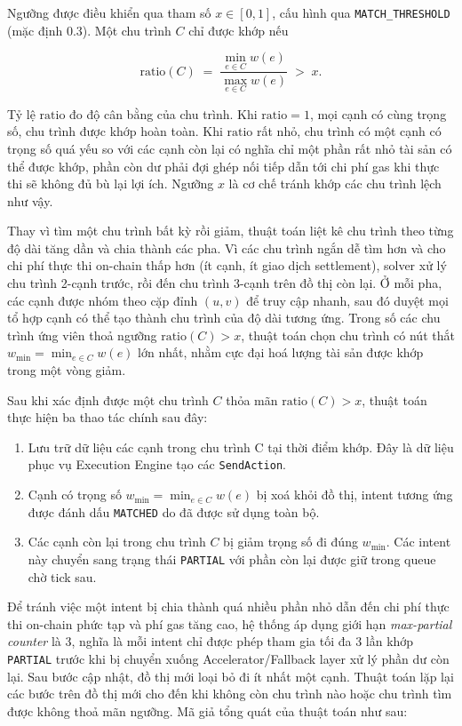 Ngưỡng được điều khiển qua tham số $x \in [0, 1]$, cấu hình 
qua \texttt{MATCH\_THRESHOLD} (mặc định $0.3$). 
Một chu trình $C$ chỉ được khớp nếu

\[
  \mathrm{ratio}(C) \;=\; \frac{\min_{e \in C} w(e)}{\max_{e \in C} w(e)} \;>\; x.
\]

Tỷ lệ $\mathrm{ratio}$ đo độ cân bằng của chu trình.
Khi $\mathrm{ratio} = 1$, mọi cạnh có cùng trọng số, 
chu trình được khớp hoàn toàn. 
Khi $\mathrm{ratio}$ rất nhỏ, chu trình có một cạnh có trọng số 
quá yếu so 
với các cạnh còn lại có nghĩa chỉ một phần rất nhỏ tài 
sản có thể được khớp, phần còn dư phải đợi ghép nối tiếp dẫn tới 
chi phí gas khi thực thi sẽ không đủ bù lại lợi ích. 
Ngưỡng $x$ là cơ chế tránh khớp các chu trình lệch như vậy.

Thay vì tìm một chu trình bất kỳ rồi giảm, thuật toán liệt kê chu trình theo
từng độ dài tăng dần và chia thành các pha. Vì các chu trình ngắn dễ tìm hơn
và cho chi phí thực thi on-chain thấp hơn (ít cạnh, ít giao dịch settlement),
solver xử lý chu trình 2-cạnh trước, rồi đến chu trình 3-cạnh trên đồ thị còn
lại. Ở mỗi pha, các cạnh được nhóm theo cặp đỉnh $(u, v)$ để truy cập nhanh,
sau đó duyệt mọi tổ hợp cạnh có thể tạo thành chu trình của độ dài tương ứng.
Trong số các chu trình ứng viên thoả ngưỡng $\mathrm{ratio}(C) > x$, thuật
toán chọn chu trình có nút thắt $w_{\min} = \min_{e \in C} w(e)$ lớn nhất,
nhằm cực đại hoá lượng tài sản được khớp trong một vòng giảm.

Sau khi xác định được một chu trình $C$ thỏa mãn $\mathrm{ratio}(C) > x$, thuật toán
thực hiện ba thao tác chính sau đây:

\begin{enumerate}
    \item Lưu trữ dữ liệu các cạnh trong chu trình C tại thời điểm khớp. Đây là dữ liệu phục vụ Execution Engine tạo các \texttt{SendAction}.
    \item Cạnh có trọng số $w_{\min} = \min_{e \in C} w(e)$ bị xoá khỏi đồ thị, intent tương ứng được đánh dấu \texttt{MATCHED} do đã được sử dụng toàn bộ.
    \item Các cạnh còn lại trong chu trình $C$ bị giảm trọng số đi đúng $w_{\min}$. Các intent này chuyển sang trạng thái \texttt{PARTIAL} với phần còn lại được giữ trong queue chờ tick sau.
\end{enumerate}

Để tránh việc một intent bị chia thành quá nhiều phần nhỏ dẫn đến chi phí thực thi
on-chain phức tạp và phí gas tăng cao, hệ thống áp dụng giới hạn \emph{max-partial
counter} là 3, nghĩa là mỗi intent chỉ được phép tham gia tối đa 3 lần khớp \texttt{PARTIAL}
trước khi bị chuyển xuống Accelerator/Fallback layer xử lý phần dư còn lại. Sau bước cập nhật, đồ thị mới loại bỏ đi ít nhất một cạnh. Thuật toán lặp lại các bước trên đồ thị mới cho đến khi không còn chu trình nào hoặc chu trình tìm được không thoả mãn ngưỡng.
Mã giả tổng quát của thuật toán như sau:

